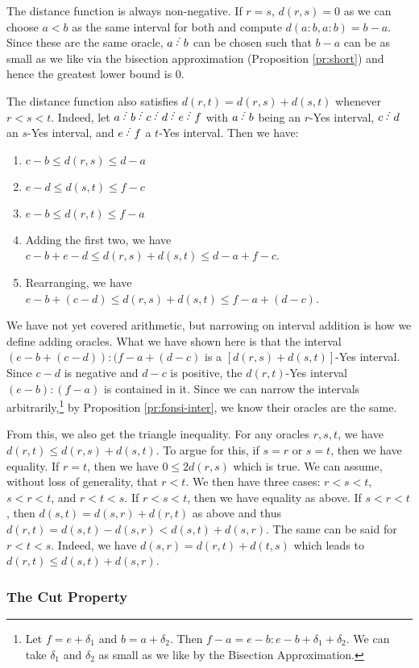 \documentclass[12pt]{article}
\begin{document}
The distance function is always non-negative. If $r=s$, $d(r,s)=0$ as we can choose $a<b$ as the same interval for both and compute $d(a:b,a:b)= b-a$. Since these are the same oracle, $a\lte b$ can be chosen such that $b-a$ can be as small as we like via the bisection approximation (Proposition \ref{pr:short}) and hence the greatest lower bound is 0. 

The distance function also satisfies $d(r,t) = d(r,s) + d(s,t)$ whenever $r < s < t$. Indeed, let $a\lte b\lte c\lte d\lte e\lte f$ with $a\lte b$ being an $r$-Yes interval, $c\lte d$ an $s$-Yes interval, and $e\lte f$ a $t$-Yes interval. Then we have: 
\begin{enumerate}
\item $c-b \leq d(r,s) \leq d-a$
\item $e-d \leq d(s,t) \leq f-c$
\item $e-b \leq d(r,t) \leq f-a$
\item Adding the first two, we have $c-b + e-d \leq d(r,s) + d(s,t) \leq d-a + f-c$.
\item Rearranging, we have $e-b + (c-d) \leq d(r,s) + d(s,t) \leq f-a + (d-c)$.
\end{enumerate}
We have not yet covered arithmetic, but narrowing on interval addition is how we define adding oracles. What we have shown here is that the interval $(e-b + (c-d)): (f-a + (d-c)$ is a $[d(r,s) + d(s,t)]$-Yes interval. Since $c-d$ is negative and $d-c$ is positive, the $d(r,t)$-Yes interval $(e-b):(f-a)$ is contained in it. Since we can narrow the intervals arbitrarily,\footnote{Let $f = e + \delta_1$ and $b = a + \delta_2$. Then $f-a = e-b:e-b + \delta_1 + \delta_2$. We can take $\delta_1$ and $\delta_2$ as small as we like by the Bisection Approximation.} by Proposition \ref{pr:fonsi-inter}, we know their oracles are the same. 

From this, we also get the triangle inequality. For any oracles $r, s, t$, we have $d(r,t) \leq d(r,s) + d(s,t)$.  To argue for this, if $s = r$ or $s=t$, then we have equality. If $r=t$, then we have $0 \leq 2 d(r,s)$ which is true. We can assume, without loss of generality, that $r < t$. We then have three cases: $r< s< t$, $s < r < t$, and $r< t  < s$. If $r < s< t$, then we have equality as above. If $s < r < t$, then $d(s,t) = d(s,r) + d(r,t)$ as above and thus $d(r,t) = d(s,t) - d(s,r) < d(s,t) + d(s,r)$. The same can be said for $r < t < s$. Indeed,  we have $d(s,r) = d(r,t) + d(t,s)$ which leads to $d(r,t) \leq d(s,t) + d(s,r)$.

\subsubsection{The Cut Property}
\end{document}
